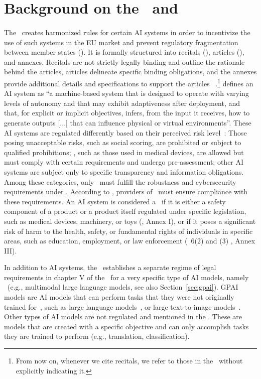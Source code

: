 
\section{Background on the \EUAIAct\ and }
\label{sec:background_aia}

\paragraph{\EUAIAct} 
The \EUAIAct\ creates harmonized rules for certain AI systems in order to incentivize the use of such systems in the EU market and prevent regulatory fragmentation between member states ().
%
It is formally structured into recitals (\EWx), articles (\Artx), and annexes. Recitals are not strictly legally binding and outline the rationale behind the articles, articles delineate specific binding
%  
obligations, and the annexes provide additional details and 
specifications to support the articles
~\citep{klimas15law}.\footnote{From now on, whenever we cite recitals, we refer to those in the \EUAIAct\ without explicitly indicating it.}
% 
 defines an AI system as ``a machine-based system that is designed to operate with varying levels
of autonomy and that may exhibit adaptiveness after deployment, and that, for explicit or
implicit objectives, infers, from the input it receives, how to generate outputs [...] that can influence physical or virtual
environments''. 
%
These AI systems are regulated differently based on their perceived risk level~\citep{bomhard2024AIAct, sioli2021}: Those posing unacceptable risks, such as social scoring, are prohibited or subject to qualified prohibitions; \HRAIS, such as those used in 
%
medical devices, are allowed but must comply with certain requirements and undergo pre-assessment; other AI systems are subject only to specific transparency and information obligations. 
%
Among these categories, only \HRAIS\ must fulfill the robustness and cybersecurity requirements under .
%
According to , providers of \HRAIS\ must ensure compliance with these requirements. 
%
An AI system is considered a \HRAIS\ if it is either a safety component of a product or a product itself regulated under specific legislation, such as medical devices, machinery, or toys (, Annex I), or if it poses a significant risk of harm to the health, safety, or fundamental rights of individuals in specific areas, such as education, employment, or law enforcement (\Artx\ 6(2) and (3) \EUAIAct, Annex III).

In addition to AI systems, the \EUAIAct\ establishes a separate regime of legal requirements in chapter V of the \EUAIAct\ for a very specific type of AI models, namely \GPAIM\ (e.g., multimodal large language models, see also Section~\ref{sec:gpai}).
%
GPAI models are AI models that can perform tasks that they were not originally trained for~\citep{gutierrez2023proposal}, such as large language models~\cite{openai2023gpt, team2023gemini}, or large text-to-image models~\cite{ramesh2022hierarchical}. Other types of AI models are not regulated and mentioned in the \EUAIAct.
These are models that are created with a specific objective and can only accomplish tasks they are trained to perform (e.g., translation, classification).

